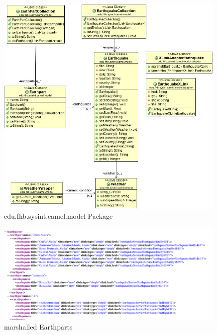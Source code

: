\documentclass[11pt,english,ngerman, headsepline]{scrreprt}
\begin{document}
 \begin{figure}[h!]
	\begin{center}
	\includegraphics[width=0.99\textwidth]{pics/modelDia.JPG}
	\end{center}
	\caption{edu.fhb.sysint.camel.model Package}
	\label{modelDia.JPG} 
   \end{figure}
   
   
   \begin{figure}[h!]
	\begin{center}
	\includegraphics[width=0.99\textwidth]{pics/marshalledEarthparts}
	\end{center}
	\caption{marshalled Earthparts}
	\label{picmarshalledEarthparts} 
   \end{figure}
   
\end{document}
